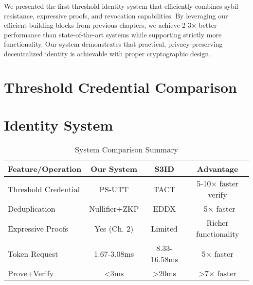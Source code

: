 We presented the first threshold identity system that efficiently combines sybil resistance, expressive proofs, and revocation capabilities. By leveraging our efficient building blocks from previous chapters, we achieve 2-3× better performance than state-of-the-art systems while supporting strictly more functionality. Our system demonstrates that practical, privacy-preserving decentralized identity is achievable with proper cryptographic design.














\section{Threshold Credential Comparison}




\section{Identity System}

\begin{table}[h]
\centering
\caption{System Comparison Summary}
\begin{tabular}{lccc}
\toprule
\textbf{Feature/Operation} & \textbf{Our System} & \textbf{S3ID} & \textbf{Advantage} \\
\midrule
Threshold Credential & PS-UTT & TACT & 5-10× faster verify \\
Deduplication & Nullifier+ZKP & EDDX & ~5× faster \\
Expressive Proofs & Yes (Ch. 2) & Limited & Richer functionality \\
Token Request & 1.67-3.08ms & 8.33-16.58ms & 5× faster \\
Prove+Verify & <3ms & >20ms & >7× faster \\
\bottomrule
\end{tabular}
\end{table}
